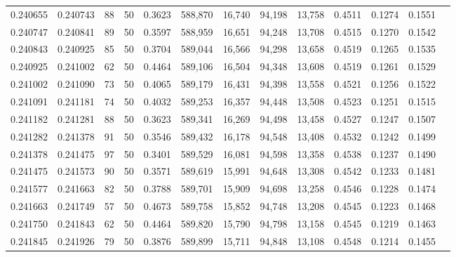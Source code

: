 \begin{tabular}{rrrrrrrrrrrrr}
0.240655 & 0.240743 &    88 &  50 &                                     0.3623 & 588,870 &  16,740 &  94,198 &  13,758 & 0.4511 & 0.1274 & 0.1551 \\
0.240747 & 0.240841 &    89 &  50 &                                     0.3597 & 588,959 &  16,651 &  94,248 &  13,708 & 0.4515 & 0.1270 & 0.1542 \\
0.240843 & 0.240925 &    85 &  50 &                                     0.3704 & 589,044 &  16,566 &  94,298 &  13,658 & 0.4519 & 0.1265 & 0.1535 \\
0.240925 & 0.241002 &    62 &  50 &                                     0.4464 & 589,106 &  16,504 &  94,348 &  13,608 & 0.4519 & 0.1261 & 0.1529 \\
0.241002 & 0.241090 &    73 &  50 &                                     0.4065 & 589,179 &  16,431 &  94,398 &  13,558 & 0.4521 & 0.1256 & 0.1522 \\
0.241091 & 0.241181 &    74 &  50 &                                     0.4032 & 589,253 &  16,357 &  94,448 &  13,508 & 0.4523 & 0.1251 & 0.1515 \\
0.241182 & 0.241281 &    88 &  50 &                                     0.3623 & 589,341 &  16,269 &  94,498 &  13,458 & 0.4527 & 0.1247 & 0.1507 \\
0.241282 & 0.241378 &    91 &  50 &                                     0.3546 & 589,432 &  16,178 &  94,548 &  13,408 & 0.4532 & 0.1242 & 0.1499 \\
0.241378 & 0.241475 &    97 &  50 &                                     0.3401 & 589,529 &  16,081 &  94,598 &  13,358 & 0.4538 & 0.1237 & 0.1490 \\
0.241475 & 0.241573 &    90 &  50 &                                     0.3571 & 589,619 &  15,991 &  94,648 &  13,308 & 0.4542 & 0.1233 & 0.1481 \\
0.241577 & 0.241663 &    82 &  50 &                                     0.3788 & 589,701 &  15,909 &  94,698 &  13,258 & 0.4546 & 0.1228 & 0.1474 \\
0.241663 & 0.241749 &    57 &  50 &                                     0.4673 & 589,758 &  15,852 &  94,748 &  13,208 & 0.4545 & 0.1223 & 0.1468 \\
0.241750 & 0.241843 &    62 &  50 &                                     0.4464 & 589,820 &  15,790 &  94,798 &  13,158 & 0.4545 & 0.1219 & 0.1463 \\
0.241845 & 0.241926 &    79 &  50 &                                     0.3876 & 589,899 &  15,711 &  94,848 &  13,108 & 0.4548 & 0.1214 & 0.1455 \\

\end{tabular}
